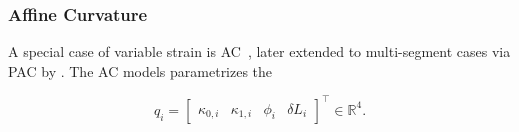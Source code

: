 \subsubsection{Affine Curvature}
A special case of variable strain is \gls{AC}~\citep{della2020soft, stella2022experimental}, later extended to multi-segment cases via \gls{PAC} by \citet{stella2023piecewise}.
The \gls{AC} models parametrizes the 

\begin{equation}
    q_i = \begin{bmatrix}\kappa_{0,i} & \kappa_{1,i} & \phi_i & \delta L_{i} \end{bmatrix}^{\top} \in \mathbb{R}^4.
\end{equation}